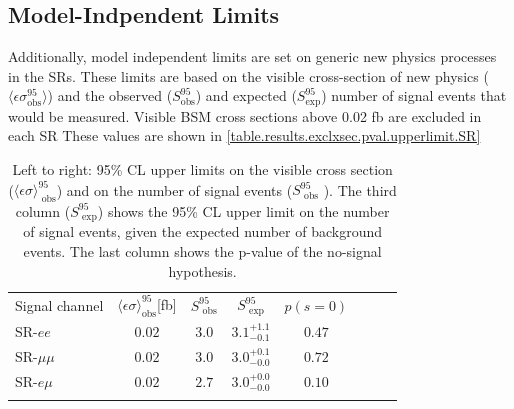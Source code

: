 \subsection{Model-Indpendent Limits}
Additionally, model independent limits are set on generic new physics processes in the \acp{SR}. These limits are based on the visible cross-section of new physics ($\langle \epsilon \sigma^{95}_{\text{obs}} \rangle$) and the observed ($S^{95}_{\text{obs}}$) and expected ($S^{95}_{\text{exp}}$) number of signal events that would be measured. Visible \ac{BSM} cross sections above 0.02 fb are excluded in each \ac{SR} These values are shown in \autoref{table.results.exclxsec.pval.upperlimit.SR}

\begin{table}
\centering
\begin{tabular*}{\textwidth}{@{\extracolsep{\fill}}lccccccc}
\noalign{\smallskip}\noalign{\smallskip}
{ Signal channel} & $\langle\epsilon{ \sigma}\rangle_\text{obs}^{95}$[fb]  &  $S_\text{ obs}^{95}$  & $S_\text{ exp}^{95}$  & $p(s=0)$ 
\\
\noalign{\smallskip}\hline\noalign{\smallskip}
 SR-$ee$   & $0.02$ &  $3.0$ & $ { 3.1 }^{ +1.1 }_{ -0.1 }$ &  $ 0.47$ \\%
 SR-$\mu\mu$   &$0.02$ &  $3.0$ & $ { 3.0 }^{ +0.1 }_{ -0.0 }$ & $ 0.72$ \\%
SR-$e\mu$   &$0.02$ &  $2.7$ & $ { 3.0 }^{ +0.0 }_{ -0.0 }$ & $ 0.10$ \\%
\noalign{\smallskip}\hline\noalign{\smallskip}
\end{tabular*}
\caption[Breakdown of upper limits.]{
Left to right: 95\% CL upper limits on the visible cross section
($\langle\epsilon\sigma\rangle_\text{ obs}^{95}$) and on the number of
signal events ($S_\text{ obs}^{95}$ ).  The third column
($S_\text{ exp}^{95}$) shows the 95\% CL upper limit on the number of
signal events, given the expected number of background events. The last column shows the p-value of the no-signal hypothesis.
\label{table.results.exclxsec.pval.upperlimit.SR}}
\end{table}

